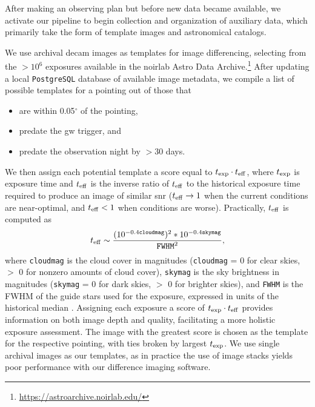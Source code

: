 \documentclass[twocolumn]{aastex631}
\newcommand{\postgresql}{\texttt{PostgreSQL}}
\newcommand{\teff}{t_{\rm eff}}
\begin{document}
After making an observing plan but before new data became available, we activate our pipeline to begin collection and organization of auxiliary data, which primarily take the form of template images and astronomical catalogs.

We use archival \gls{decam} images as templates for image differencing, selecting from the $>10^6$ exposures available in the \gls{noirlab} Astro Data Archive.\footnote{\url{https://astroarchive.noirlab.edu/}}
After updating a local \postgresql{} database of available image metadata, we compile a list of possible templates for a pointing out of those that
\begin{itemize}
    \item are within 0.05$^\circ$ of the pointing,
    \item predate the \gls{gw} trigger, and
    \item predate the observation night by $>$30 days.
\end{itemize}

We then assign each potential template a score equal to $t_{\rm exp} \cdot \teff$, where $t_{\rm exp}$ is exposure time and $\teff$ is the inverse ratio of $t_{\rm eff}$ to the historical exposure time required to produce an image of similar \gls{snr} ($\teff \to 1$ when the current conditions are near-optimal, and $\teff < 1$ when conditions are worse).
Practically, $\teff$ is computed as
\begin{equation}
    \teff
    \sim
    \frac{(10^{-0.4\texttt{cloudmag}})^2 * 10^{-0.4\texttt{skymag}}}{\texttt{FWHM}^2},
\end{equation}
where \texttt{cloudmag} is the cloud cover in magnitudes (\texttt{cloudmag} = 0 for clear skies, $>$ 0 for nonzero amounts of cloud cover), \texttt{skymag} is the sky brightness in magnitudes (\texttt{skymag} = 0 for dark skies, $>$ 0 for brighter skies), and \texttt{FWHM} is the FWHM of the guide stars used for the exposure, expressed in units of the historical median \citep{morgansonDarkEnergySurvey2018}.
Assigning each exposure a score of $t_{\rm exp} \cdot \teff$ provides information on both image depth and quality, facilitating a more holistic exposure assessment.
The image with the greatest score is chosen as the template for the respective pointing, with ties broken by largest $t_{\rm exp}$.
We use single archival images as our templates, as in practice the use of image stacks yields poor performance with our difference imaging software.

\end{document}
